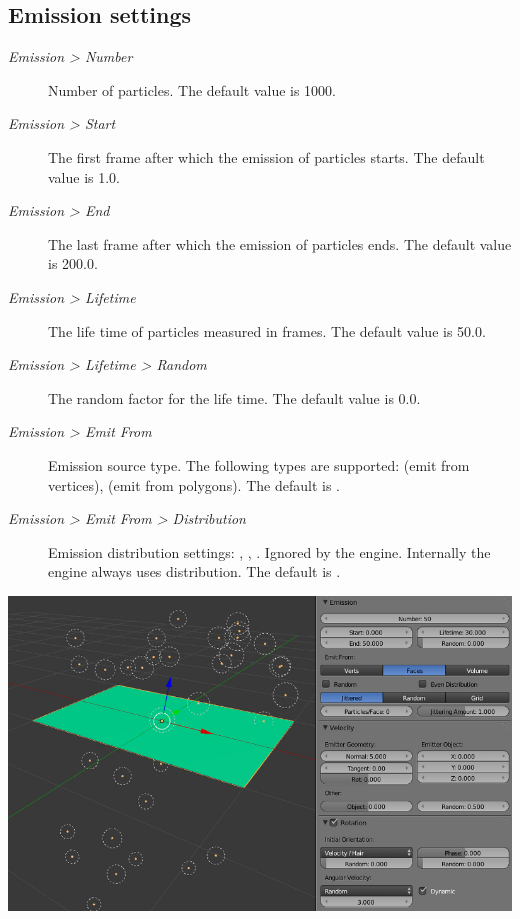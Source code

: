 \documentclass[a4paper,12pt,oneside]{sphinxmanual}
\begin{document}
\subsection{Emission settings}
\label{particles:id7}\begin{description}
\item[{\emph{Emission \textgreater{} Number}}] \leavevmode
Number of particles. The default value is 1000.

\item[{\emph{Emission \textgreater{} Start}}] \leavevmode
The first frame after which the emission of particles starts. The default value is 1.0.

\item[{\emph{Emission \textgreater{} End}}] \leavevmode
The last frame after which the emission of particles ends. The default value is 200.0.

\item[{\emph{Emission \textgreater{} Lifetime}}] \leavevmode
The life time of particles measured in frames. The default value is 50.0.

\item[{\emph{Emission \textgreater{} Lifetime \textgreater{} Random}}] \leavevmode
The random factor for the life time. The default value is 0.0.

\item[{\emph{Emission \textgreater{} Emit From}}] \leavevmode
Emission source type. The following types are supported:  (emit from vertices),  (emit from polygons). The default is .

\item[{\emph{Emission \textgreater{} Emit From \textgreater{} Distribution}}] \leavevmode
Emission distribution settings: , , . Ignored by the engine. Internally the engine always uses  distribution. The default is .

\end{description}

{\hfill\includegraphics[width=1.000\linewidth]{particles_settings.jpg}\hfill}
\end{document}
